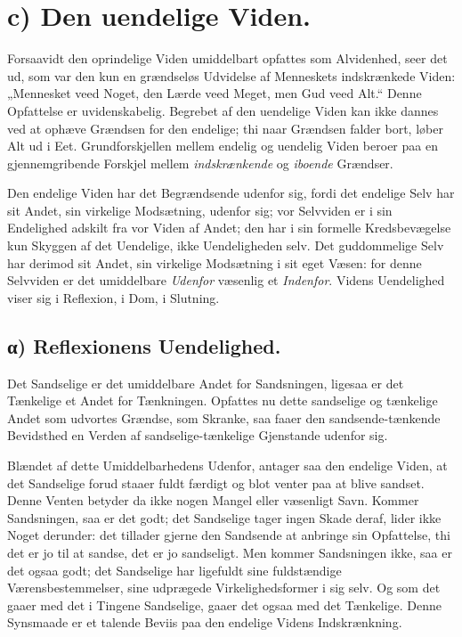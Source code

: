 \documentclass[12pt]{book}
\newcommand{\opage}[1]{\marginnote{\footnotesize\textit{[#1]}}}
\begin{document}
\section*{c) Den uendelige Viden.}

Forsaavidt den oprindelige Viden umiddelbart opfattes som
Alvidenhed, seer det ud, som var den kun en grændseløs Udvidelse af
Menneskets indskrænkede Viden: „Mennesket veed Noget, den Lærde veed
Meget, men Gud veed Alt.“ Denne Opfattelse er uvidenskabelig.
Begrebet af den uendelige Viden kan ikke dannes ved at ophæve
Grændsen for den endelige; thi naar Grændsen falder bort, løber Alt
ud i Eet. Grundforskjellen mellem endelig og uendelig Viden beroer
paa en gjennemgribende Forskjel mellem \emph{indskrænkende} og
\emph{iboende} Grændser.

Den endelige Viden har det Begrændsende udenfor sig, fordi det
endelige Selv har sit Andet, sin virkelige Modsætning, udenfor sig;
vor Selvviden er i sin Endelighed adskilt fra vor Viden af Andet; den
har i sin formelle Kredsbevægelse kun Skyggen af det Uendelige, ikke
Uendeligheden selv. Det guddommelige Selv har derimod sit Andet, sin
virkelige Modsætning i sit eget Væsen: for denne Selvviden er det
umiddelbare \emph{Udenfor} væsenlig et \emph{Indenfor}. Videns
Uendelighed viser sig i Reflexion, i Dom, i Slutning.

\subsection*{α) Reflexionens Uendelighed.}

Det Sandselige er det umiddelbare Andet for Sandsningen, ligesaa er
det Tænkelige et Andet for Tænkningen. Opfattes nu dette sandselige
og tænkelige Andet som udvortes Grændse, som
\opage{15} Skranke, saa faaer den sandsende-tænkende Bevidsthed en Verden af
sandselige-tænkelige Gjenstande udenfor sig.

Blændet af dette Umiddelbarhedens Udenfor, antager saa den endelige
Viden, at det Sandselige forud staaer fuldt færdigt og blot venter
paa at blive sandset. Denne Venten betyder da ikke nogen Mangel eller
væsenligt Savn. Kommer Sandsningen, saa er det godt; det Sandselige
tager ingen Skade deraf, lider ikke Noget derunder: det tillader
gjerne den Sandsende at anbringe sin Opfattelse, thi det er jo til at
sandse, det er jo sandseligt. Men kommer Sandsningen ikke, saa er det
ogsaa godt; det Sandselige har ligefuldt sine fuldstændige
Værensbestemmelser, sine udprægede Virkelighedsformer i sig selv. Og
som det gaaer med det i Tingene Sandselige, gaaer det ogsaa med det
Tænkelige. Denne Synsmaade er et talende Beviis paa den endelige
Videns Indskrænkning.
\end{document}
